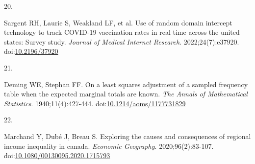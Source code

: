 \documentclass[
  letterpaper,
  DIV=11,
  numbers=noendperiod]{scrartcl}
\newlength{\cslhangindent}
\newlength{\csllabelwidth}
\newlength{\cslentryspacingunit} %
\newenvironment{CSLReferences}[2] %
 {%
  \setlength{\parindent}{0pt}
  \ifodd #1
  \let\oldpar\par
  \def\par{\hangindent=\cslhangindent\oldpar}
  \fi
  \setlength{\parskip}{#2\cslentryspacingunit}
 }%
 {}
\newcommand{\CSLLeftMargin}[1]{\parbox[t]{\csllabelwidth}{#1}}
\newcommand{\CSLRightInline}[1]{\parbox[t]{\linewidth - \csllabelwidth}{#1}\break}
\begin{document}
\begin{CSLReferences}{0}{0}
\leavevmode{}%
\CSLLeftMargin{20. }%
\CSLRightInline{Sargent RH, Laurie S, Weakland LF, et al. Use of random
domain intercept technology to track {COVID}-19 vaccination rates in
real time across the united states: Survey study. \emph{Journal of
Medical Internet Research}. 2022;24(7):e37920.
doi:\href{https://doi.org/10.2196/37920}{10.2196/37920}}

\leavevmode{}%
\CSLLeftMargin{21. }%
\CSLRightInline{Deming WE, Stephan FF. On a least squares adjustment of
a sampled frequency table when the expected marginal totals are known.
\emph{The Annals of Mathematical Statistics}. 1940;11(4):427-444.
doi:\href{https://doi.org/10.1214/aoms/1177731829}{10.1214/aoms/1177731829}}

\leavevmode{}%
\CSLLeftMargin{22. }%
\CSLRightInline{Marchand Y, Dubé J, Breau S. Exploring the causes and
consequences of regional income inequality in canada. \emph{Economic
Geography}. 2020;96(2):83-107.
doi:\href{https://doi.org/10.1080/00130095.2020.1715793}{10.1080/00130095.2020.1715793}}

\end{CSLReferences}
\end{document}
